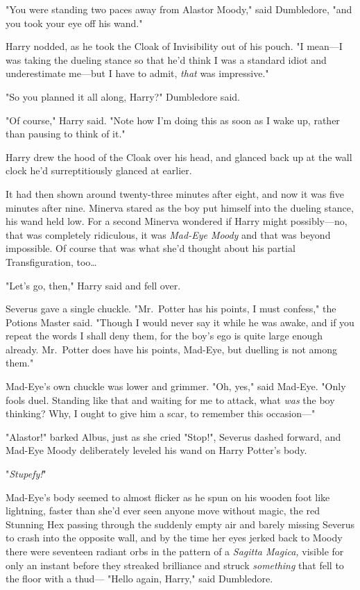 "You were standing two paces away from Alastor Moody," said Dumbledore, "and
you took your eye off his wand."

Harry nodded, as he took the Cloak of Invisibility out of his pouch. "I
mean---I was taking the dueling stance so that he'd think I was a standard
idiot and underestimate me---but I have to admit, \emph{that} was impressive."

"So you planned it all along, Harry?" Dumbledore said.

"Of course," Harry said. "Note how I'm doing this as soon as I wake up, rather
than pausing to think of it."

Harry drew the hood of the Cloak over his head, and glanced back up at the wall
clock he'd surreptitiously glanced at earlier.

It had then shown around twenty-three minutes after eight, and now it was five
minutes after nine.
\later
Minerva stared as the boy put himself into the dueling stance, his wand held
low. For a second Minerva wondered if Harry might possibly---no, that was
completely ridiculous, it was \emph{Mad-Eye Moody} and that was beyond
impossible. Of course that was what she'd thought about his partial
Transfiguration, too{\ldots}

"Let's go, then," Harry said and fell over.

Severus gave a single chuckle. "Mr.~Potter has his points, I must confess," the
Potions Master said. "Though I would never say it while he was awake, and if
you repeat the words I shall deny them, for the boy's ego is quite large enough
already. Mr.~Potter does have his points, Mad-Eye, but duelling is not among
them."

Mad-Eye's own chuckle was lower and grimmer. "Oh, yes," said Mad-Eye. "Only
fools duel. Standing like that and waiting for me to attack, what \emph{was}
the boy thinking? Why, I ought to give him a scar, to remember this occasion---"

"Alastor!" barked Albus, just as she cried "Stop!", Severus dashed forward, and
Mad-Eye Moody deliberately leveled his wand on Harry Potter's body.

"\emph{Stupefy!}"

Mad-Eye's body seemed to almost flicker as he spun on his wooden foot like
lightning, faster than she'd ever seen anyone move without magic, the red
Stunning Hex passing through the suddenly empty air and barely missing Severus
to crash into the opposite wall, and by the time her eyes jerked back to Moody
there were seventeen radiant orbs in the pattern of a \emph{Sagitta Magica,}
visible for only an instant before they streaked brilliance and struck
\emph{something} that fell to the floor with a thud---
\later
"Hello again, Harry," said Dumbledore.

